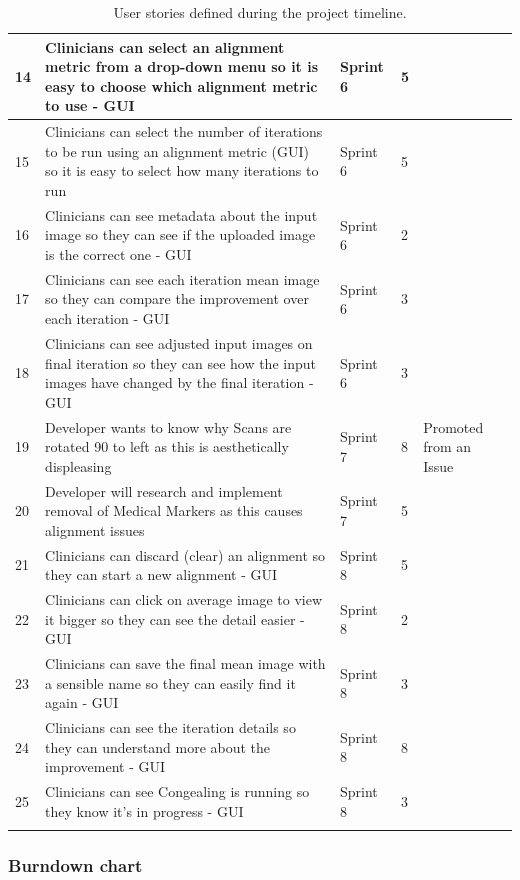 \begin{center}
\begin{longtable}{| p{2cm} | p{4cm} | p{2cm}  | p{2cm} | p{3cm} |}
      14 & Clinicians can select an alignment metric from a drop-down menu so it is easy to choose which alignment metric to use - \acrshort{GUI} & Sprint 6 & 5 & \\ \hline
      15 & Clinicians can select the number of iterations to be run using an alignment metric (GUI) so it is easy to select how many iterations to run & Sprint 6 & 5 & \\ \hline
      16 & Clinicians can see metadata about the input image so they can see if the uploaded image is the correct one - \acrshort{GUI} & Sprint 6 & 2 & \\ \hline
      17 & Clinicians can see each iteration mean image so they can compare the improvement over each iteration - \acrshort{GUI} & Sprint 6 & 3 & \\ \hline
      18 & Clinicians can see adjusted input images on final iteration so they can see how the input images have changed by the final iteration - \acrshort{GUI} & Sprint 6 & 3 & \\ \hline
      19 & Developer wants to know why Scans are rotated 90 to left as this is aesthetically displeasing & Sprint 7 & 8 & Promoted from an Issue \\ \hline
      20 & Developer will research and implement removal of Medical Markers as this causes alignment issues & Sprint 7 & 5 & \\ \hline
      21 & Clinicians can discard (clear) an alignment so they can start a new alignment - \acrshort{GUI} & Sprint 8 & 5 & \\ \hline
      22 & Clinicians can click on average image to view it bigger so they can see the detail easier - \acrshort{GUI} & Sprint 8 & 2 & \\ \hline
      23 & Clinicians can save the final mean image with a sensible name so they can easily find it again - \acrshort{GUI} & Sprint 8 & 3 & \\ \hline
      24 & Clinicians can see the iteration details so they can understand more about the improvement - \acrshort{GUI} & Sprint 8 & 8 & \\ \hline
      25 & Clinicians can see \Gls{Congealing} is running so they know it's in progress - \acrshort{GUI} & Sprint 8 & 3 & \\ \hline
  \caption{User stories defined during the project timeline.}
  \label{table:User Stories}
\end{longtable}
\end{center}

\subsubsection{Burndown chart}

